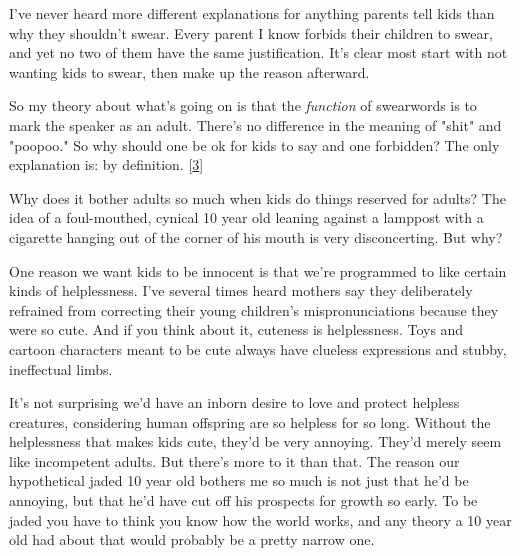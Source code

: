 I've never heard more
                  different explanations for anything parents tell kids than why
                  they shouldn't swear. Every parent I know forbids their
                  children to swear, and yet no two of them have the same
                  justification. It's clear most start with not wanting kids to
                  swear, then make up the reason afterward.

So my
                  theory about what's going on is that the \emph{function} of
                  swearwords is to mark the speaker as an adult. There's no
                  difference in the meaning of "shit" and "poopoo." So why
                  should one be ok for kids to say and one forbidden? The only
                  explanation is: by definition.
                  [\href{\#f3n}{3}]

Why does it bother adults so much when kids do
                  things reserved for adults? The idea of a foul-mouthed,
                  cynical 10 year old leaning against a lamppost with a
                  cigarette hanging out of the corner of his mouth is very
                  disconcerting. But why?

One reason we want kids to
                  be innocent is that we're programmed to like certain kinds of
                  helplessness. I've several times heard mothers say they
                  deliberately refrained from correcting their young children's
                  mispronunciations because they were so cute. And if you think
                  about it, cuteness is helplessness. Toys and cartoon
                  characters meant to be cute always have clueless expressions
                  and stubby, ineffectual limbs.

It's not surprising
                  we'd have an inborn desire to love and protect helpless
                  creatures, considering human offspring are so helpless for so
                  long. Without the helplessness that makes kids cute, they'd be
                  very annoying. They'd merely seem like incompetent adults. But
                  there's more to it than that. The reason our hypothetical
                  jaded 10 year old bothers me so much is not just that he'd be
                  annoying, but that he'd have cut off his prospects for growth
                  so early. To be jaded you have to think you know how the world
                  works, and any theory a 10 year old had about that would
                  probably be a pretty narrow one.

